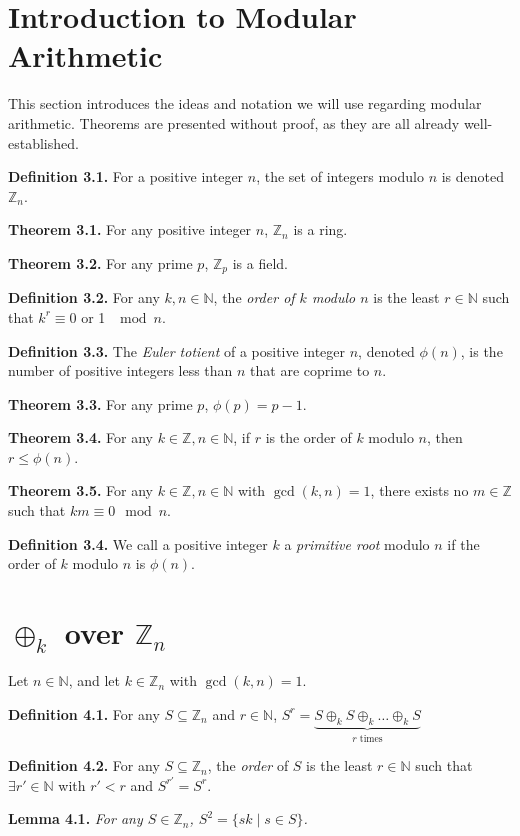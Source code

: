 \documentclass{article}
\newcommand{\zee}{\mathbb{Z}}
\newcommand{\N}{\mathbb{N}}
\begin{document}
\setcounter{section}{2}
\section{Introduction to Modular Arithmetic}

This section introduces the ideas and notation we will use regarding
modular arithmetic.
Theorems are presented without proof,
as they are all already well-established.

\textbf{Definition 3.1.} For a positive integer $n$, the set of integers
modulo $n$ is denoted $\zee_n$.

\textbf{Theorem 3.1.} For any positive integer $n$, $\zee_n$ is a ring.

\textbf{Theorem 3.2.} For any prime $p$, $\zee_p$ is a field.

\textbf{Definition 3.2.} For any $k, n \in \N$, the \textit{order
of $k$ modulo $n$} is the least $r \in \N$ such that
$k^r \equiv 0$ or 1 $\mod n$.

\textbf{Definition 3.3.} The \textit{Euler totient} of a
positive integer $n$,
denoted $\phi(n)$, is the number of positive integers less than $n$
that are coprime to $n$.

\textbf{Theorem 3.3.} For any prime $p$, $\phi(p) = p - 1$.

\textbf{Theorem 3.4.} For any $k \in \zee, n \in \N$, if $r$ is the order of
$k$ modulo $n$, then $r \leq \phi(n)$.

\textbf{Theorem 3.5.} For any $k \in \zee, n \in \N$ with
$\gcd(k, n) = 1$, there exists no $m \in \zee$ such that
$km \equiv 0 \mod n$.

\textbf{Definition 3.4.} We call a positive integer $k$ a
\textit{primitive root} modulo $n$ if the order of $k$ modulo $n$
is $\phi(n)$.

\section{$\oplus_k$ over $\zee_n$}

Let $n \in \N$, and let $k \in \zee_n$ with $\gcd(k, n) = 1$.

\textbf{Definition 4.1.} For any $S \subseteq \zee_n$ and $r \in \N$,
$S^r = \underbrace{S \oplus_k S \oplus_k \ldots \oplus_k S}
_{r\text{ times}}$

\textbf{Definition 4.2.} For any $S \subseteq \zee_n$, the \textit{order}
of $S$ is the least $r \in \N$ such that $\exists r' \in \N$ with
$r' < r$ and $S^{r'} = S^r$.

\textbf{Lemma 4.1.} \textit{For any $S \in \zee_n$,
$S^2 = \{sk \mid s \in S\}$.}
\end{document}
